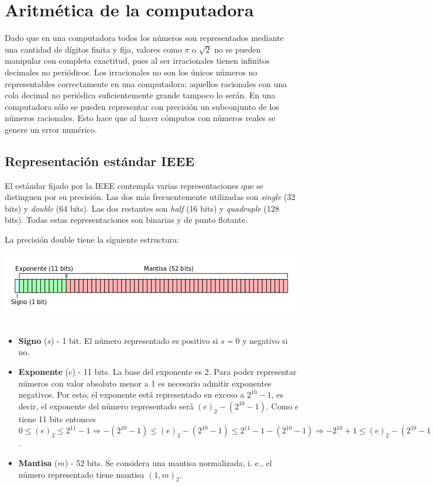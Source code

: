 \section{Aritmética de la computadora}

Dado que en una computadora todos los números son representados mediante una cantidad de dígitos finita y fija, valores como $\pi$ o $\sqrt{2}$ no se pueden manipular con completa exactitud, pues al ser irracionales tienen infinitos decimales no periódicos. Los irracionales no son los únicos números no representables correctamente en una computadora: aquellos racionales con una cola decimal no periódica suficientemente grande tampoco lo serán. En una computadora sólo se pueden representar con precisión un subconjunto de los números racionales. Esto hace que al hacer cómputos con números reales se genere un error numérico.

\subsection{Representación estándar IEEE}

El estándar fijado por la IEEE contempla varias representaciones que se distinguen por su precisión. Las dos más frecuentemente utilizadas son \emph{single} (32 bits) y \emph{double} (64 bits). Las dos restantes son \emph{half} (16 bits) y \emph{quadruple} (128 bits). Todas estas representaciones son binarias y de punto flotante.

La precisión double tiene la siguiente estructura:

\begin{center}
	\includegraphics[scale = 0.68]{imagenes/ieee.png}~\\[0.25cm]
\end{center}

\begin{itemize}
	\item \textbf{Signo} ($s$) - 1 bit. El número representado es positivo si $s = 0$ y negativo si no.
	
	\item \textbf{Exponente} ($e$) - 11 bits. La base del exponente es 2. Para poder representar números con valor absoluto menor a 1 es necesario admitir exponentes negativos. Por esto, el exponente está representado en exceso a $2^{10} - 1$, es decir, el exponente del número representado será $(e)_{2} - (2^{10} - 1)$. Como $e$ tiene 11 bits entonces $0 \leq (e)_{2} \leq 2^{11} - 1 \Rightarrow -(2^{10} - 1) \leq (e)_{2} - (2^{10} - 1) \leq 2^{11} - 1 - (2^{10} - 1) \Rightarrow -2^{10} + 1 \leq (e)_{2} - (2^{10} - 1) \leq 2^{10}$.
	
	\item \textbf{Mantisa} ($m$) - 52 bits. Se considera una mantisa normalizada, i. e., el número representado tiene mantisa $(1, m)_{2}$.
\end{itemize}

